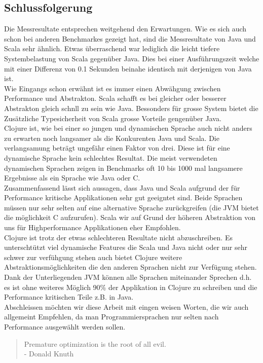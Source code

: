 \documentclass{fancydocument}
\begin{document}
\subsection{Schlussfolgerung}
Die Messresultate entsprechen weitgehend den Erwartungen. Wie es sich
auch schon bei anderen Benchmarkes gezeigt hat, sind die Messresultate
von Java und Scala sehr ähnlich. Etwas überraschend war lediglich die
leicht tiefere Systembelastung von Scala gegenüber Java. Dies bei
einer Ausführungszeit welche mit einer Differenz von 0.1 Sekunden
beinahe identisch mit derjenigen von Java ist. 
\\
Wie Eingangs schon erw\"ahnt ist es immer einen Abw\"ahgung zwischen
Performance und Abstrakton. Scala schafft es bei gleicher oder
besserer Abstrakton gleich schnll zu sein wie Java. Bessonders f\"ur
grosse System bietet die Zus\"atzliche Typesicherheit von Scala grosse
Vorteile gengen\"uber Java.
\\
Clojure ist, wie bei einer so jungen und dynamischen  Sprache auch nicht anders zu
erwarten noch langsamer als die Konkurenten Java und Scala. Die
verlangsamung beträgt ungef\"ahr einen Faktor von drei. Diese ist
f\"ur eine dynamische Sprache kein schlechtes Resultat. Die meist
verwendeten dynamischen Sprachen zeigen in Benchmarks oft 10 bis 1000 mal langsamere
Ergebnisse als ein Sprache wie Java oder C.
\\
Zusammenfassend lässt sich aussagen, dass Java und Scala aufgrund der
f\"ur Performance kritische Applikationen sehr gut geeigntet
sind. Beide Sprachen m\"ussen nur sehr selten auf eine alternative
Sprache zur\"uckgreifen (die JVM bietet die m\"oglichkeit C
aufzurufen). Scala wir auf Grund der h\"oheren Abstraktion von uns
f\"ur Highperformance Applikationen eher Empfohlen.
\\
Clojure ist trotz der etwas schlechteren Resultate nicht
abzuschreiben. Es unterscht\"utzt viel dynamische Features die Scala
und Java nicht oder nur sehr schwer zur verf\"uhgung stehen auch
bietet Clojure weitere Abstraktionsm\"oglichkeiten die den anderen
Sprachen nicht zur Verf\"ugung stehen.
\\
Dank der Unterliegenden JVM k\"onnen alle Sprachen miteinander
Sprechen d.h. es ist ohne weiteres M\"oglich 90\% der Applikation in
Clojure zu schreiben und die Performance kritischen Teile z.B. in Java.
\\
Abschleissen m\"ochten wir diese Arbeit mit eingen weisen Worten, die
wir auch allgemeint Empfehlen, da man Programmiersprachen nur selten
nach Performance ausgew\"ahlt werden sollen.
\begin{quote}
Premature optimization is the root of all evil.\\
- Donald Knuth
 \end{quote}
\newpage
\end{document}
